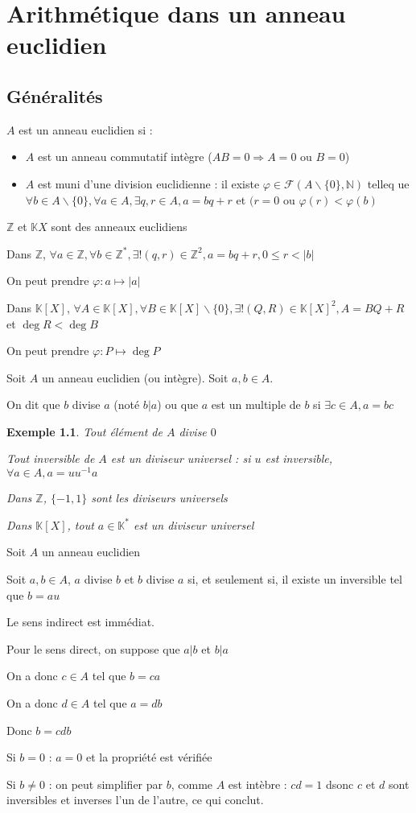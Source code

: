 \documentclass[a4paper,12pt]{book}
\newcommand{\Def}[2]{\begin{tcolorbox}[sharp corners, colback=white,colframe=blue!90!black!75, title=Définition : #1]#2\end{tcolorbox}}
\newcommand{\Prop}[2]{\begin{tcolorbox}[sharp corners, colback=white,colframe=red!90!black!75, title=Proposition : #1]#2\end{tcolorbox}}
\newcommand{\Pre}[1]{\begin{tcolorbox}[sharp corners, colback=white,colframe=green!60!green!30!black!75, title=Preuve]#1\end{tcolorbox}}
\newtheorem{Exe}{Exemple}[section]
\def\N{\mathbb{N}}
\def\Z{\mathbb{Z}}
\def\K{\mathbb{K}}
\begin{document}
\chapter{Arithmétique dans un anneau euclidien}
\section{Généralités}
\Def{Anneau euclidien}{$A$ est un anneau euclidien si :\begin{itemize}
\item $A$ est un anneau commutatif intègre ($AB=0 \Rightarrow A=0\text{ ou } B=0$)
\item $A$ est muni d'une division euclidienne : il existe $\varphi\in\mathcal{F}(A\backslash\{0\},\N)$ telleq ue $\forall b\in A\backslash\{0\}, \forall a\in A, \exists q,r\in A, a =bq+r$ et $(r=0\text{ ou }\varphi(r)<\varphi(b)$
\end{itemize}}
$\Z$ et $\K{X}$ sont des anneaux euclidiens
\par Dans $\Z$, $\forall a\in \Z, \forall b\in \Z^*, \exists!(q,r)\in\Z^2, a =bq+r, 0\leq r<\vert b\vert$ \par On peut prendre $\varphi:a\mapsto \vert a\vert$
\par Dans $\K[X]$, $\forall A\in\K[X], \forall B\in\K[X]\backslash\{0\}, \exists !(Q,R)\in\K[X]^2, A=BQ+R$ et $\deg R<\deg B$ \par On peut prendre $\varphi:P\mapsto \deg P$
\Def{Divisibilité}{Soit $A$ un anneau euclidien (ou intègre). Soit $a,b\in A$. \par On dit que $b$ divise $a$ (noté $b|a$) ou que $a$ est un multiple de $b$ si $\exists c\in A, a = bc$}
\begin{Exe}
Tout élément de $A$ divise $0$
\par Tout inversible de $A$ est un diviseur universel : si $u$ est inversible, $\forall a\in A, a = uu^{-1}a$ \par Dans $\Z$, $\{-1,1\}$ sont les diviseurs universels \par Dans $\K[X]$, tout $a\in\K^*$ est un diviseur universel
\end{Exe}
\Prop{Association}{Soit $A$ un anneau euclidien \par Soit $a,b\in A$, $a$ divise $b$ et $b$ divise $a$ si, et seulement si, il existe un inversible tel que $b = au$}
\Pre{Le sens indirect est immédiat.
\par Pour le sens direct, on suppose que $a|b$ et $b|a$ \par On a donc $c\in A$ tel que $b=ca$ \par On a donc $d\in A$ tel que $a =db$ \par Donc $b=cdb$ \par Si $b=0$ : $a=0$ et la propriété est vérifiée \par Si $b\neq 0$ : on peut simplifier par $b$, comme $A$ est intèbre : $cd=1$ dsonc $c$ et $d$ sont inversibles et inverses l'un de l'autre, ce qui conclut.}
\end{document}
